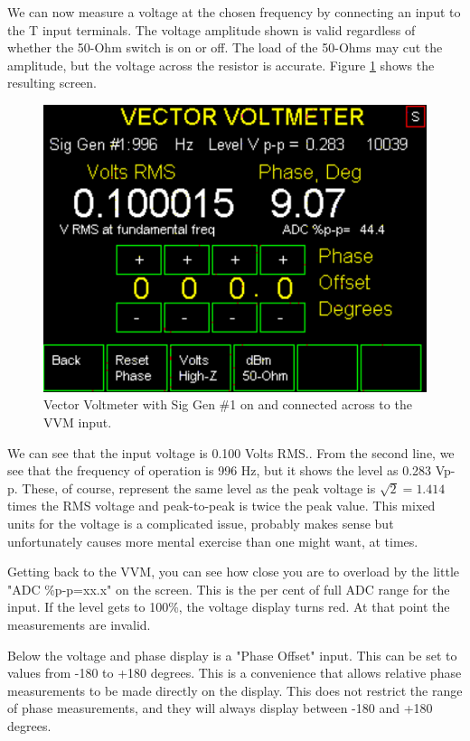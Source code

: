 We can now measure a voltage at the chosen frequency by connecting an input to the T input terminals.  The voltage amplitude shown is valid regardless of whether the 50-Ohm switch is on or off.  The load of the 50-Ohms may cut the amplitude, but the voltage across the resistor is accurate.  Figure  \ref{AVNA_016-label} shows the resulting screen.
%
\begin{figure}[H]
\begin{center}
\includegraphics[scale=0.75]{./images/AVNA_016.pdf}
\caption{Vector Voltmeter with Sig Gen \#1 on and connected across to the VVM input.}
\label{AVNA_016-label}
\end{center}
\end{figure}
%
We can see that the input voltage is 0.100 Volts RMS..  From the second line, we see that the frequency of operation is 996 Hz, but it shows the level as 0.283 Vp-p.  These, of course, represent the same level  as the peak voltage is $\sqrt{2} = 1.414$ times the RMS voltage and peak-to-peak is twice the peak value.   This mixed units for the voltage is a complicated issue, probably makes sense but unfortunately causes more mental exercise than one might want, at times.

 Getting back to the VVM, you can see how close you are to overload by the little "ADC \%p-p=xx.x" on the screen.  This is the per cent of full ADC range for  the input.  If the level gets to 100\%, the voltage display turns red.  At that point the measurements are invalid.

Below the voltage and phase display is a "Phase Offset" input.  This can be set to values from -180 to +180 degrees.  This is a convenience that allows relative phase measurements to be made directly on the display.  This does not restrict the range of phase measurements, and they will always display between -180 and +180 degrees.

